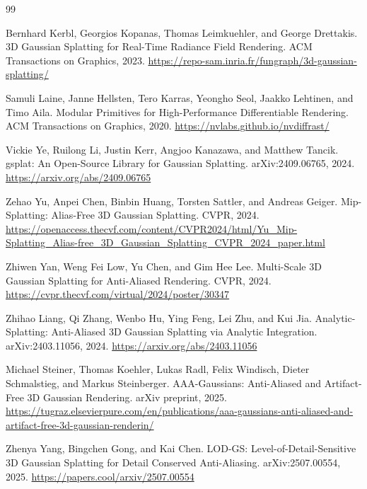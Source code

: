 \documentclass[11pt]{article}
\begin{document}
\begin{thebibliography}{99}

Bernhard Kerbl, Georgios Kopanas, Thomas Leimkuehler, and George Drettakis.
\newblock 3D Gaussian Splatting for Real-Time Radiance Field Rendering.
\newblock ACM Transactions on Graphics, 2023.
\newblock \url{https://repo-sam.inria.fr/fungraph/3d-gaussian-splatting/}

Samuli Laine, Janne Hellsten, Tero Karras, Yeongho Seol, Jaakko Lehtinen,
and Timo Aila.
\newblock Modular Primitives for High-Performance Differentiable Rendering.
\newblock ACM Transactions on Graphics, 2020.
\newblock \url{https://nvlabs.github.io/nvdiffrast/}

Vickie Ye, Ruilong Li, Justin Kerr, Angjoo Kanazawa, and Matthew Tancik.
\newblock gsplat: An Open-Source Library for Gaussian Splatting.
\newblock arXiv:2409.06765, 2024.
\newblock \url{https://arxiv.org/abs/2409.06765}

Zehao Yu, Anpei Chen, Binbin Huang, Torsten Sattler, and Andreas Geiger.
\newblock Mip-Splatting: Alias-Free 3D Gaussian Splatting.
\newblock CVPR, 2024.
\newblock \url{https://openaccess.thecvf.com/content/CVPR2024/html/Yu_Mip-Splatting_Alias-free_3D_Gaussian_Splatting_CVPR_2024_paper.html}

Zhiwen Yan, Weng Fei Low, Yu Chen, and Gim Hee Lee.
\newblock Multi-Scale 3D Gaussian Splatting for Anti-Aliased Rendering.
\newblock CVPR, 2024.
\newblock \url{https://cvpr.thecvf.com/virtual/2024/poster/30347}

Zhihao Liang, Qi Zhang, Wenbo Hu, Ying Feng, Lei Zhu, and Kui Jia.
\newblock Analytic-Splatting: Anti-Aliased 3D Gaussian Splatting via Analytic
Integration.
\newblock arXiv:2403.11056, 2024.
\newblock \url{https://arxiv.org/abs/2403.11056}

Michael Steiner, Thomas Koehler, Lukas Radl, Felix Windisch,
Dieter Schmalstieg, and Markus Steinberger.
\newblock AAA-Gaussians: Anti-Aliased and Artifact-Free 3D Gaussian Rendering.
\newblock arXiv preprint, 2025.
\newblock \url{https://tugraz.elsevierpure.com/en/publications/aaa-gaussians-anti-aliased-and-artifact-free-3d-gaussian-renderin/}

Zhenya Yang, Bingchen Gong, and Kai Chen.
\newblock LOD-GS: Level-of-Detail-Sensitive 3D Gaussian Splatting for Detail
Conserved Anti-Aliasing.
\newblock arXiv:2507.00554, 2025.
\newblock \url{https://papers.cool/arxiv/2507.00554}


\end{thebibliography}
\end{document}
